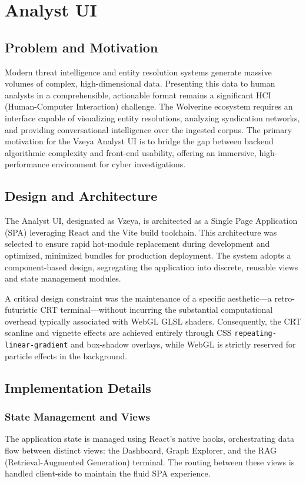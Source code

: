 \chapter{Analyst UI}
\label{ch:analyst-ui}

\section{Problem and Motivation}

Modern threat intelligence and entity resolution systems generate massive volumes of complex, high-dimensional data. Presenting this data to human analysts in a comprehensible, actionable format remains a significant HCI (Human-Computer Interaction) challenge. The Wolverine ecosystem requires an interface capable of visualizing entity resolutions, analyzing syndication networks, and providing conversational intelligence over the ingested corpus. The primary motivation for the Vzeya Analyst UI is to bridge the gap between backend algorithmic complexity and front-end usability, offering an immersive, high-performance environment for cyber investigations.

\section{Design and Architecture}

The Analyst UI, designated as Vzeya, is architected as a Single Page Application (SPA) leveraging React and the Vite build toolchain. This architecture was selected to ensure rapid hot-module replacement during development and optimized, minimized bundles for production deployment. The system adopts a component-based design, segregating the application into discrete, reusable views and state management modules.

A critical design constraint was the maintenance of a specific aesthetic---a retro-futuristic CRT terminal---without incurring the substantial computational overhead typically associated with WebGL GLSL shaders. Consequently, the CRT scanline and vignette effects are achieved entirely through CSS \texttt{repeating-linear-gradient} and box-shadow overlays, while WebGL is strictly reserved for particle effects in the background.

\section{Implementation Details}

\subsection{State Management and Views}
The application state is managed using React's native hooks, orchestrating data flow between distinct views: the Dashboard, Graph Explorer, and the RAG (Retrieval-Augmented Generation) terminal. The routing between these views is handled client-side to maintain the fluid SPA experience. 

